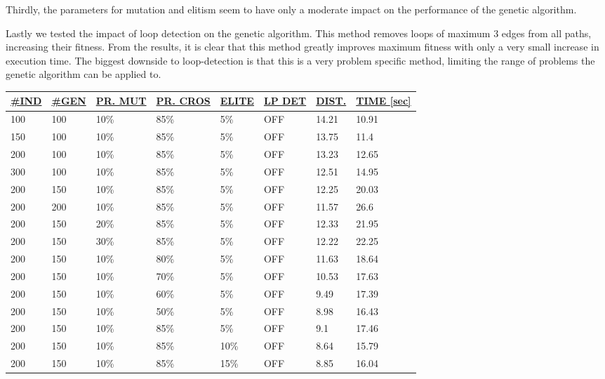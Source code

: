 Thirdly, the parameters for mutation and elitism seem to have only a moderate impact on the performance of the genetic algorithm.

Lastly we tested the impact of loop detection on the genetic algorithm. This method removes loops of maximum 3 edges from all paths, increasing their fitness. From the results, it is clear that this method greatly improves maximum fitness with only a very small increase in execution time. The biggest downside to loop-detection is that this is a very problem specific method, limiting the range of problems the genetic algorithm can be applied to.

\begin{table}[!]
\centering
\begin{tabular}{ | l | l | l | l | l | l | l | l | }
\hline
{\ul \textbf{\#IND}} & {\ul \textbf{\#GEN}} & {\ul \textbf{PR. MUT}} & {\ul \textbf{PR. CROS}} & {\ul \textbf{ELITE}} & {\ul \textbf{LP DET}} & {\ul \textbf{DIST.}} & {\ul \textbf{TIME {[}sec{]}}} \\ \hline
	100 & 100 & 10\% & 85\% & 5\% & OFF & 14.21 & 10.91 \\ \hline
	150 & 100 & 10\% & 85\% & 5\% & OFF & 13.75 & 11.4 \\ \hline
	200 & 100 & 10\% & 85\% & 5\% & OFF & 13.23 & 12.65 \\ \hline
	300 & 100 & 10\%&  85\% & 5\% & OFF & 12.51 & 14.95 \\ \hline
	200 & 150 & 10\% & 85\% & 5\% & OFF & 12.25 & 20.03 \\ \hline
	200 & 200 & 10\% & 85\% & 5\% & OFF & 11.57 & 26.6 \\ \hline
	200 & 150 & 20\% & 85\% & 5\% & OFF & 12.33 & 21.95 \\ \hline
	200 & 150 & 30\% & 85\% & 5\% & OFF & 12.22 & 22.25 \\ \hline
	200 & 150 & 10\% & 80\% & 5\% & OFF & 11.63 & 18.64 \\ \hline
	200 & 150 & 10\% & 70\% & 5\% & OFF & 10.53 & 17.63 \\ \hline
	200 & 150 & 10\%& 60\% & 5\% & OFF & 9.49 & 17.39 \\ \hline
	200 & 150 & 10\% & 50\% & 5\% & OFF & 8.98 & 16.43 \\ \hline
	200 & 150 & 10\% & 85\% & 5\% & OFF & 9.1 & 17.46 \\ \hline
	200 & 150 & 10\% & 85\% & 10\% & OFF & 8.64 & 15.79 \\ \hline
	200 & 150 & 10\% & 85\% & 15\% & OFF & 8.85 & 16.04 \\ \hline

\end{tabular}
\end{table}
